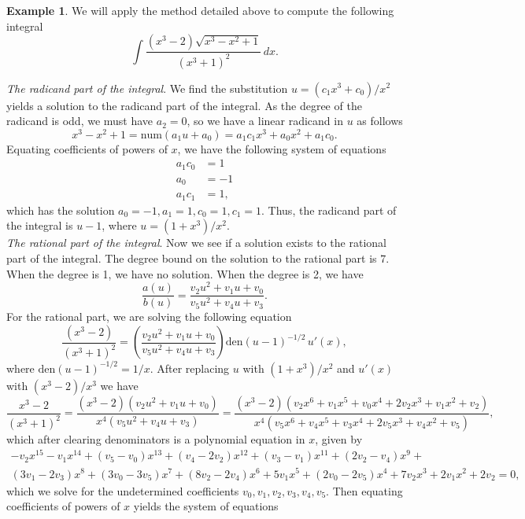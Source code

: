 \documentclass[12pt]{article}
\numberwithin{equation}{section}
\theoremstyle{definition}
\newtheorem{example}{Example}[section]
\begin{document}
\begin{example}
We will apply the method detailed above to compute the following integral
$$\int \frac{\left(x^3-2\right) \sqrt{x^3-x^2+1}}{\left(x^3+1\right)^2} \, dx.$$ 

\noindent\textit{The radicand part of the integral}. We find the substitution 
$u=\left(c_1 x^3+c_0\right)/x^2$ yields a solution to the radicand part of the 
integral. As the degree of the radicand is odd, we must have $a_2=0$, so we have 
a linear radicand in $u$ as follows 
$$x^3-x^2+1 = \text{num}\left( a_1u + a_0 \right) = a_1 c_1 x^3 + a_0 x^2 + a_1 c_0.$$
Equating coefficients of powers of $x$, we have the following system of equations
\begin{align*}
 a_1 c_0 &= 1\\
 a_0 &= -1\\
 a_1 c_1 &= 1,
\end{align*}
which has the solution $a_0 = -1, a_1 = 1, c_0 = 1, c_1 = 1$. Thus, the radicand part of the 
integral is $u-1$, where $u=\left(1+x^3\right)/x^2$. \\

\noindent\textit{The rational part of the integral}. Now we see if a solution exists to the 
rational part of the integral. The degree bound on the solution to the rational part 
is 7. When the degree is 1, we have no solution. When the degree is 2, we have
$$\frac{a(u)}{b(u)}=\frac{v_2u^2+v_1u+v_0}{v_5u^2+v_4u+v_3}.$$
For the rational part, we are solving the following equation
$$\frac{\left(x^3-2\right)}{\left(x^3+1\right)^2} = 
	\left(\frac{v_2u^2+v_1u+v_0}{v_5u^2+v_4u+v_3}\right)\text{den}(u-1)^{-1/2}\,u'(x),$$
where $\text{den}(u-1)^{-1/2}=1/x$. After replacing $u$ with $\left(1+x^3\right)/x^2$ and 
$u'(x)$ with $\left(x^3-2\right)/x^3$ we have
$$\frac{x^3-2}{\left(x^3+1\right)^2}=
\frac{\left(x^3-2\right) \left(v_2u^2+v_1u+v_0\right)}{x^4 \left(v_5u^2+v_4u+v_3\right)}=
\frac{\left(x^3-2\right)\left(v_2x^6+v_1x^5+v_0x^4+2 v_2x^3+v_1x^2+v_2\right)}
	{x^4 \left(v_5x^6+v_4x^5+v_3x^4+2 v_5x^3+v_4x^2+v_5 \right)},$$
which after clearing denominators is a polynomial equation in $x$, given by
\begin{multline*}
-v_2 x^{15}-v_1 x^{14}+\left(v_5-v_0\right) x^{13}+\left(v_4-2 v_2\right) x^{12}
+\left(v_3-v_1\right) x^{11}+\left(2 v_2-v_4\right) x^9+ \\
\left(3v_1-2 v_3\right) x^8+\left(3 v_0-3 v_5\right) x^7+
\left(8 v_2-2 v_4\right) x^6+5 v_1 x^5+\left(2 v_0-2 v_5\right) x^4+7 v_2 x^3+2 v_1 x^2+2 v_2=0,
\end{multline*}
which we solve for the undetermined coefficients $v_0,v_1,v_2,v_3,v_4,v_5$. Then equating coefficients of powers of $x$ yields the system of equations


\end{example}
\end{document}
